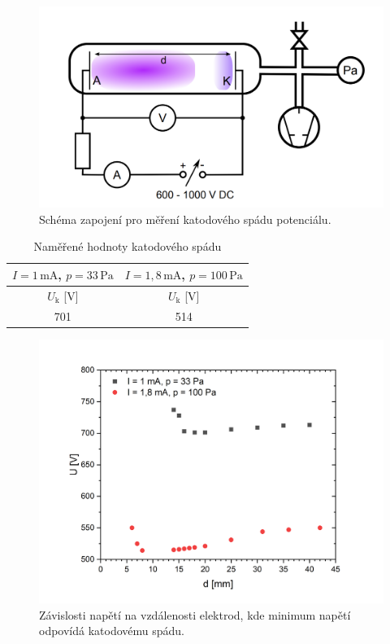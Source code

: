 \documentclass[a4paper,12pt]{article}
\begin{document}
\begin{figure}[h!]
	\centering
	\includegraphics[width=145mm]{schema2v2.png}
	\caption{Schéma zapojení pro měření katodového spádu potenciálu.}
	\label{schema2v2}
\end{figure}

\begin{center}
	\begin{table}[h!]
		\centering
		\caption{Naměřené hodnoty katodového spádu}
		\label{tab2}
		\begin{tabular}{|c|c|} \hline
			$I = 1\,\si{\milli\ampere}$, $p = 33\,\si{\pascal}$ 
			& $I = 1,8\,\si{\milli\ampere}$, $p = 100\,\si{\pascal}$\\ \hline
			$U_\text{k}$ [V] & $U_\text{k}$ [V]\\ \hline
			701 & 514 \\ \hline
			
		\end{tabular}
	\end{table}
\end{center}

\begin{figure}[h!]
	\centering
	\includegraphics[width=145mm]{KatodovySpad.png}
	\caption{Závislosti napětí na vzdálenosti elektrod, kde minimum napětí odpovídá katodovému spádu.}
	\label{KatodovySpad}
\end{figure}
\end{document}
